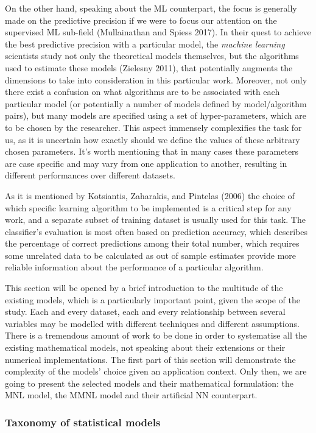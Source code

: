 \documentclass[12pt,]{article}
\begin{document}
On the other hand, speaking about the ML counterpart, the focus is
generally made on the predictive precision if we were to focus our
attention on the supervised ML sub-field (Mullainathan and Spiess 2017).
In their quest to achieve the best predictive precision with a
particular model, the \emph{machine learning} scientists study not only
the theoretical models themselves, but the algorithms used to estimate
these models (Zielesny 2011), that potentially augments the dimensions
to take into consideration in this particular work. Moreover, not only
there exist a confusion on what algorithms are to be associated with
each particular model (or potentially a number of models defined by
model/algorithm pairs), but many models are specified using a set of
hyper-parameters, which are to be chosen by the researcher. This aspect
immensely complexifies the task for us, as it is uncertain how exactly
should we define the values of these arbitrary chosen parameters. It's
worth mentioning that in many cases these parameters are case specific
and may vary from one application to another, resulting in different
performances over different datasets.

As it is mentioned by Kotsiantis, Zaharakis, and Pintelas (2006) the
choice of which specific learning algorithm to be implemented is a
critical step for any work, and a separate subset of training dataset is
usually used for this task. The classifier's evaluation is most often
based on prediction accuracy, which describes the percentage of correct
predictions among their total number, which requires some unrelated data
to be calculated as out of sample estimates provide more reliable
information about the performance of a particular algorithm.

This section will be opened by a brief introduction to the multitude of
the existing models, which is a particularly important point, given the
scope of the study. Each and every dataset, each and every relationship
between several variables may be modelled with different techniques and
different assumptions. There is a tremendous amount of work to be done
in order to systematise all the existing mathematical models, not
speaking about their extensions or their numerical implementations. The
first part of this section will demonstrate the complexity of the
models' choice given an application context. Only then, we are going to
present the selected models and their mathematical formulation: the MNL
model, the MMNL model and their artificial NN counterpart.

\hypertarget{taxonomy-of-statistical-models}{%
\subsubsection{Taxonomy of statistical
models}\label{taxonomy-of-statistical-models}}
\end{document}
